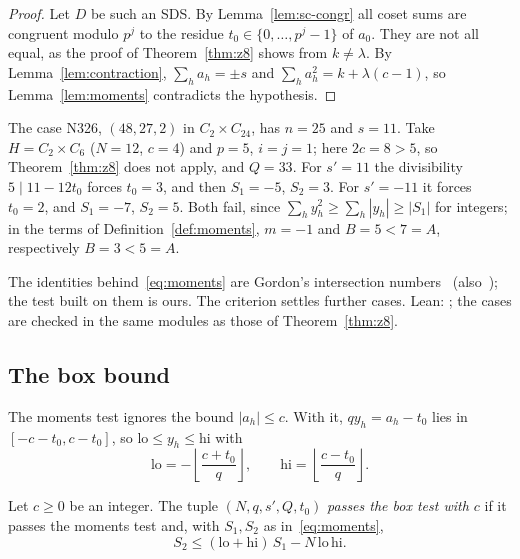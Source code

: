 \begin{proof}
Let $D$ be such an SDS. By Lemma~\ref{lem:sc-congr} all coset sums are congruent modulo $p^j$
to the residue $t_0 \in \{0, \dots, p^j - 1\}$ of $a_0$. They are not all equal, as the proof of
Theorem~\ref{thm:z8} shows from $k \neq \lambda$. By Lemma~\ref{lem:contraction},
$\sum_h a_h = \pm s$ and $\sum_h a_h^2 = k + \lambda(c - 1)$, so Lemma~\ref{lem:moments}
contradicts the hypothesis.
\end{proof}

\begin{example}
The case N326, $(48, 27, 2)$ in $C_2 \times C_{24}$, has $n = 25$ and $s = 11$. Take
$H = C_2 \times C_6$ ($N = 12$, $c = 4$) and $p = 5$, $i = j = 1$; here $2c = 8 > 5$, so
Theorem~\ref{thm:z8} does not apply, and $Q = 33$. For $s' = 11$ the divisibility
$5 \mid 11 - 12 t_0$ forces $t_0 = 3$, and then $S_1 = -5$, $S_2 = 3$. For $s' = -11$ it forces
$t_0 = 2$, and $S_1 = -7$, $S_2 = 5$. Both fail, since $\sum_h y_h^2 \ge \sum_h |y_h| \ge
|S_1|$ for integers; in the terms of Definition~\ref{def:moments}, $m = -1$ and $B = 5 < 7 = A$,
respectively $B = 3 < 5 = A$.
\end{example}

\begin{remark}
The identities behind~\eqref{eq:moments} are Gordon's intersection numbers~\cite[Lemma~5.2]{gordon}
(also~\cite[Lemma~4.1]{he-wu}); the test built on them is ours. The criterion settles
 further cases. Lean: ; the cases are
checked in the same modules as those of Theorem~\ref{thm:z8}.
\end{remark}

\subsection{The box bound}
The moments test ignores the bound $|a_h| \le c$. With it, $q y_h = a_h - t_0$ lies in
$[-c - t_0, c - t_0]$, so $\mathrm{lo} \le y_h \le \mathrm{hi}$ with
\[
  \mathrm{lo} = -\left\lfloor \frac{c + t_0}{q} \right\rfloor, \qquad
  \mathrm{hi} = \left\lfloor \frac{c - t_0}{q} \right\rfloor .
\]

\begin{definition}\label{def:box}
Let $c \ge 0$ be an integer. The tuple $(N, q, s', Q, t_0)$ \emph{passes the box test with $c$}
if it passes the moments test and, with $S_1, S_2$ as in~\eqref{eq:moments},
\[
  S_2 \le (\mathrm{lo} + \mathrm{hi})\, S_1 - N\, \mathrm{lo}\, \mathrm{hi}.
\]
\end{definition}

